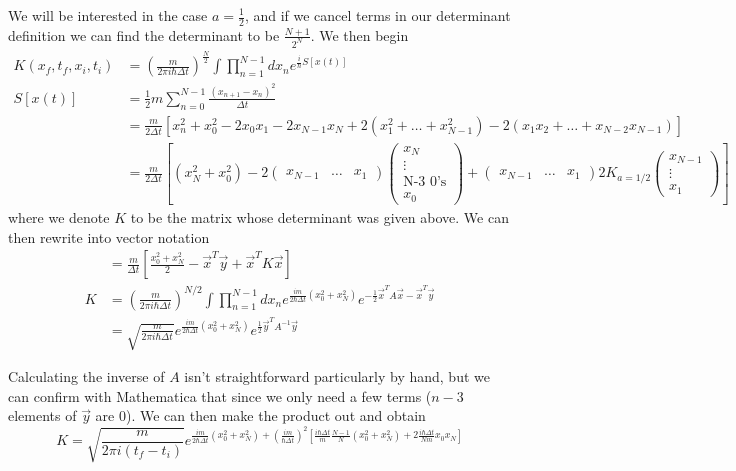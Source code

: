 \documentclass[10pt]{report}
\begin{document}
We will be interested in the case $a=\frac{1}{2}$, and if we cancel terms in our determinant definition we can find the determinant to be $\frac{N+1}{2^{N}}$. We then begin
\begin{align}
	K(x_f, t_f, x_i, t_i) &= \left( \frac{m}{2\pi i \hbar \Delta t} \right)^{\frac{N}{2}}\int \prod_{n=1}^{N-1}dx_n e^{\frac{i}{\hbar}S[x(t)]}\\
	S[x(t)] &= \frac{1}{2}m\sum_{n=0}^{N-1}\frac{(x_{n+1} - x_n)^2}{\Delta t}\\
	&= \frac{m}{2\Delta t}\left[ x_n^2 + x_0^2 - 2x_0x_1 - 2x_{N-1} x_{N} +2\left( x_1^2 + \dots + x_{N-1}^2 \right) - 2\left( x_1x_2 +\dots + x_{N-2}x_{N-1} \right)\right]\\
	&= \frac{m}{2\Delta t}\left[ (x_N^2 + x_0^2) - 2\begin{pmatrix}x_{N-1}&\dots&x_1\end{pmatrix}\begin{pmatrix}x_N\\\vdots\\ \text{N-3 0's}\\x_0\end{pmatrix} + \begin{pmatrix}x_{N-1}&\dots & x_1\end{pmatrix}2K_{a=1/2} \begin{pmatrix}x_{N-1}\\\vdots\\x_1\end{pmatrix} \right]
\end{align}
where we denote $K$ to be the matrix whose determinant was given above. We can then rewrite into vector notation
\begin{align}
	&= \frac{m}{\Delta t}\left[ \frac{x_0^2 + x_N^2}{2} - \vec{x}^{T}\vec{y} + \vec{x}^{T}K\vec{x} \right]\\
	K &= \left( \frac{m}{2\pi i \hbar \Delta t} \right)^{N/2} \int \prod_{n=1}^{N-1}dx_n e^{\frac{im}{2\hbar \Delta t}(x_0^2 + x_N^2)}e^{-\frac{1}{2}\vec{x}^{T}A\vec{x} - \vec{x}^{T}\vec{y}}\\
	&= \sqrt{\frac{m}{2\pi i \hbar \Delta t}}e^{\frac{im}{2\hbar \Delta t}\left( x_0^2 + x_{N}^2 \right)}e^{\frac{1}{2}\vec{y}^{T}A^{-1}\vec{y}}
\end{align}

Calculating the inverse of $A$ isn't straightforward particularly by hand, but we can confirm with Mathematica that since we only need a few terms ($n-3$ elements of $\vec{y}$ are $0$). We can then make the product out and obtain
$$K = \sqrt{\frac{m}{2\pi i(t_f - t_i)}} e^{\frac{im}{2\hbar \Delta t}(x_0^2 + x_N^2) + \left( \frac{im}{\hbar \Delta t} \right)^2\left[ \frac{i\hbar \Delta t}{m}\frac{N-1}{N}\left( x_0^2 + x_N^2 \right) + 2\frac{i\hbar \Delta t}{Nm}x_0 x_N \right]}$$
\end{document}
